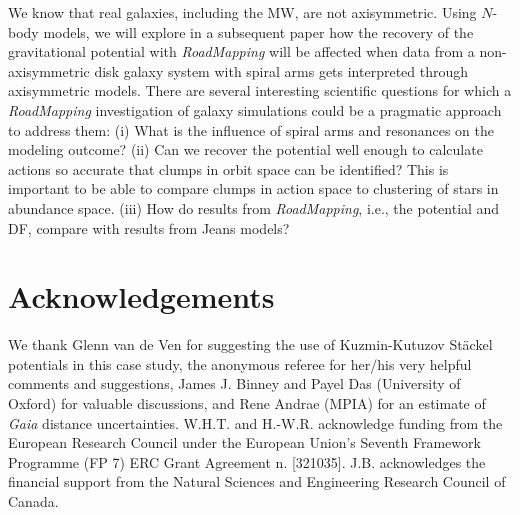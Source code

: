 \documentclass[iop,revtex4,numberedappendix,appendixfloats]{emulateapj}
\newcommand{\RM}{{\sl RoadMapping}}
\begin{document}
We know that real galaxies, including the MW, are not axisymmetric. Using $N$-body models, we will explore in a subsequent paper how the recovery of the gravitational potential with \RM{} will be affected when data from a non-axisymmetric disk galaxy system with spiral arms gets interpreted through axisymmetric models. There are several interesting scientific questions for which a \RM{} investigation of galaxy simulations could be a pragmatic approach to address them: (i) What is the influence of spiral arms and resonances on the modeling outcome? (ii) Can we recover the potential well enough to calculate actions so accurate that clumps in orbit space can be identified? This is important to be able to compare clumps in action space to clustering of stars in abundance space. (iii) How do results from \RM{}, i.e., the potential and DF, compare with results from Jeans models?


\section{Acknowledgements}

We thank Glenn van de Ven for suggesting the use of Kuzmin-Kutuzov St\"{a}ckel potentials in this case study, the anonymous referee for her/his very helpful comments and suggestions, James J. Binney and Payel Das (University of Oxford) for valuable discussions, and Rene Andrae (MPIA) for an estimate of \emph{Gaia} distance uncertainties. W.H.T. and H.-W.R. acknowledge funding from the European Research Council under the European Union's Seventh Framework Programme (FP 7) ERC Grant Agreement n. [321035]. J.B. acknowledges the financial support from the Natural Sciences and Engineering Research Council of Canada. 

{}

\end{document}
